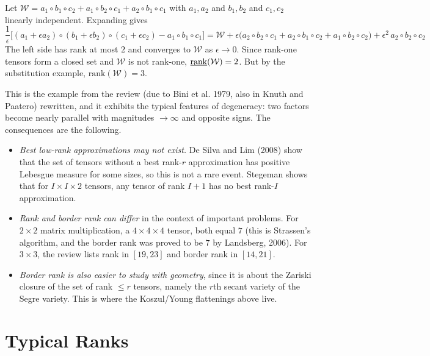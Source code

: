   \begin{example}
    Let $\mathcal{W} = a_1 \circ b_1 \circ c_2 + a_1 \circ b_2 \circ c_1 + a_2 \circ b_1 \circ c_1$ with $a_1, a_2$ and $b_1, b_2$ and $c_1, c_2$ linearly independent. Expanding gives
    \begin{equation}
      \frac{1}{\epsilon} \Big[ (a_1 + \epsilon a_2) \circ (b_1 + \epsilon b_2) \circ (c_1 + \epsilon c_2) - a_1 \circ b_1 \circ c_1 \Big] = \mathcal{W} + \epsilon \big( a_2 \circ b_2 \circ c_1 + a_2 \circ b_1 \circ c_2 + a_1 \circ b_2 \circ c_2 \big) + \epsilon^2 \, a_2 \circ b_2 \circ c_2
    \end{equation}
    The left side has rank at most $2$ and converges to $\mathcal{W}$ as $\epsilon \to 0$. Since rank-one tensors form a closed set and $\mathcal{W}$ is not rank-one, $\underline{\mathrm{rank}}(\mathcal{W}) = 2$. But by the substitution example, $\mathrm{rank}(\mathcal{W}) = 3$.
  \end{example}

  This is the example from the review (due to Bini et al. 1979, also in Knuth and Paatero) rewritten, and it exhibits the typical features of degeneracy: two factors become nearly parallel with magnitudes $\to \infty$ and opposite signs. The consequences are the following.
  \begin{itemize}
    \item \textit{Best low-rank approximations may not exist.} De Silva and Lim (2008) show that the set of tensors without a best rank-$r$ approximation has positive Lebesgue measure for some sizes, so this is not a rare event. Stegeman shows that for $I \times I \times 2$ tensors, any tensor of rank $I+1$ has no best rank-$I$ approximation.
    \item \textit{Rank and border rank can differ} in the context of important problems. For $2 \times 2$ matrix multiplication, a $4 \times 4 \times 4$ tensor, both equal $7$ (this is Strassen's algorithm, and the border rank was proved to be $7$ by Landsberg, 2006). For $3 \times 3$, the review lists rank in $[19, 23]$ and border rank in $[14, 21]$.
    \item \textit{Border rank is also easier to study with geometry}, since it is about the Zariski closure of the set of rank $\leq r$ tensors, namely the $r$th secant variety of the Segre variety. This is where the Koszul/Young flattenings above live.
  \end{itemize}

\section{Typical Ranks}

